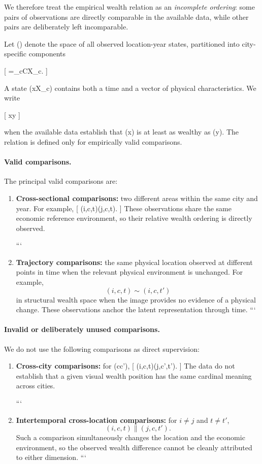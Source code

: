 We therefore treat the empirical wealth relation as an \emph{incomplete ordering}: some pairs of observations are directly comparable in the available data, while other pairs are deliberately left incomparable.

Let () denote the space of all observed location-year states, partitioned into city-specific components

[
=\bigsqcup_{c\in C}X_c.
]

A state (x\in X_c) contains both a time and a vector of physical characteristics. We write

[
x\succsim y
]

when the available data establish that (x) is at least as wealthy as (y). The relation is defined only for empirically valid comparisons.

\paragraph{Valid comparisons.}
The principal valid comparisons are:

\begin{enumerate}
\item \textbf{Cross-sectional comparisons:} two different areas within the same city and year. For example,
[
(i,c,t)\succ (j,c,t).
]
These observations share the same economic reference environment, so their relative wealth ordering is directly observed.

```
\item \textbf{Trajectory comparisons:} the same physical location observed at different points in time when the relevant physical environment is unchanged. For example,
\[
(i,c,t)\sim (i,c,t')
\]
in structural wealth space when the image provides no evidence of a physical change. These observations anchor the latent representation through time.
```

\end{enumerate}

\paragraph{Invalid or deliberately unused comparisons.}
We do not use the following comparisons as direct supervision:

\begin{enumerate}
\item \textbf{Cross-city comparisons:} for (c\neq c'),
[
(i,c,t)\parallel(j,c',t').
]
The data do not establish that a given visual wealth position has the same cardinal meaning across cities.

```
\item \textbf{Intertemporal cross-location comparisons:} for \(i\neq j\) and \(t\neq t'\),
\[
(i,c,t)\parallel(j,c,t').
\]
Such a comparison simultaneously changes the location and the economic environment, so the observed wealth difference cannot be cleanly attributed to either dimension.
```

\end{enumerate}

